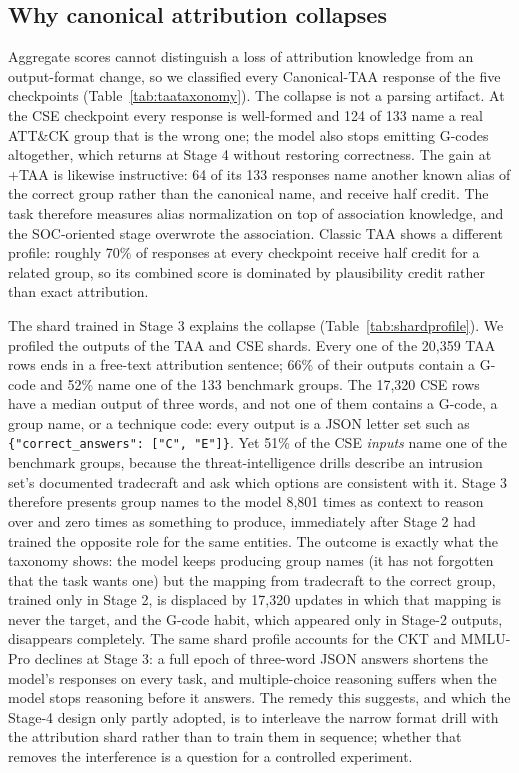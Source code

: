 \documentclass[a4paper,fleqn]{cas-dc}
\begin{document}
\subsection{Why canonical attribution collapses}\label{sec:cseshard}
Aggregate scores cannot distinguish a loss of attribution knowledge from an output-format change, so we classified every Canonical-TAA response of the five checkpoints (Table~\ref{tab:taataxonomy}). The collapse is not a parsing artifact. At the CSE checkpoint every response is well-formed and 124 of 133 name a real ATT\&CK group that is the wrong one; the model also stops emitting G-codes altogether, which returns at Stage 4 without restoring correctness. The gain at +TAA is likewise instructive: 64 of its 133 responses name another known alias of the correct group rather than the canonical name, and receive half credit. The task therefore measures alias normalization on top of association knowledge, and the SOC-oriented stage overwrote the association. Classic TAA shows a different profile: roughly 70\% of responses at every checkpoint receive half credit for a related group, so its combined score is dominated by plausibility credit rather than exact attribution.

The shard trained in Stage 3 explains the collapse (Table~\ref{tab:shardprofile}). We profiled the outputs of the TAA and CSE shards. Every one of the 20,359 TAA rows ends in a free-text attribution sentence; 66\% of their outputs contain a G-code and 52\% name one of the 133 benchmark groups. The 17,320 CSE rows have a median output of three words, and not one of them contains a G-code, a group name, or a technique code: every output is a JSON letter set such as \texttt{\{"correct\_answers": ["C", "E"]\}}. Yet 51\% of the CSE \emph{inputs} name one of the benchmark groups, because the threat-intelligence drills describe an intrusion set's documented tradecraft and ask which options are consistent with it. Stage 3 therefore presents group names to the model 8,801 times as context to reason over and zero times as something to produce, immediately after Stage 2 had trained the opposite role for the same entities. The outcome is exactly what the taxonomy shows: the model keeps producing group names (it has not forgotten that the task wants one) but the mapping from tradecraft to the correct group, trained only in Stage 2, is displaced by 17,320 updates in which that mapping is never the target, and the G-code habit, which appeared only in Stage-2 outputs, disappears completely. The same shard profile accounts for the CKT and MMLU-Pro declines at Stage 3: a full epoch of three-word JSON answers shortens the model's responses on every task, and multiple-choice reasoning suffers when the model stops reasoning before it answers. The remedy this suggests, and which the Stage-4 design only partly adopted, is to interleave the narrow format drill with the attribution shard rather than to train them in sequence; whether that removes the interference is a question for a controlled experiment.
\end{document}
